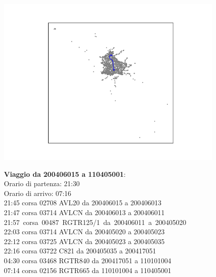 \documentclass{article}
\begin{document}
\begin{figure}[H]
	\begin{minipage}{0.55\linewidth}
		\centering
		\hspace*{-3cm}\includegraphics[width=1.0\linewidth, valign=t]{figures/200406015_110405001}
	\end{minipage}
	\hspace*{-2cm}\begin{minipage}{0.7\linewidth}
		\textbf{Viaggio da 200406015 a 110405001}:\\
		Orario di partenza: 21:30\\
		Orario di arrivo: 07:16\\
		21:45 corsa 02708 AVL20 da 200406015 a 200406013\\
		21:47 corsa 03714 AVLCN da 200406013 a 200406011\\
		\mbox{21:57 corsa 00487 RGTR125/1 da 200406011 a 200405020}\\
		22:03 corsa 03714 AVLCN da 200405020 a 200405023\\
		22:12 corsa 03725 AVLCN da 200405023 a 200405035\\
		22:16 corsa 03722 C821 da 200405035 a 200417051\\
		04:30 corsa 03468 RGTR840 da 200417051 a 110101004\\
		07:14 corsa 02156 RGTR665 da 110101004 a 110405001
		
\end{minipage}
\end{figure}
\end{document}
